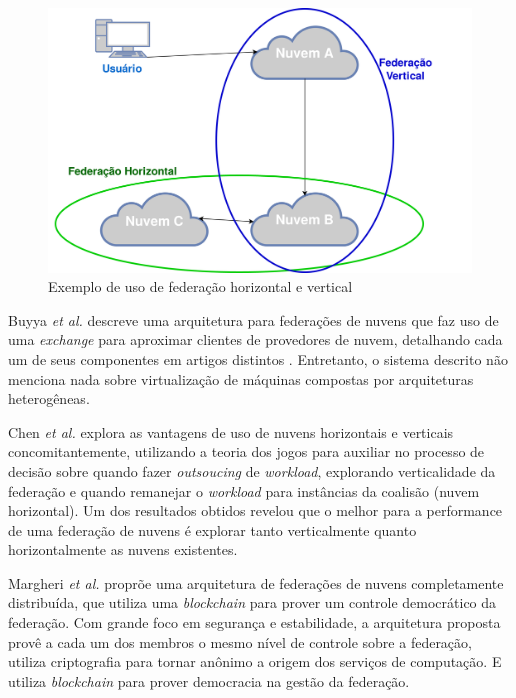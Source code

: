 \begin{figure}[htbp]
	\centerline{\includegraphics[scale=0.032]{img/ExemploFederacao.png}}
	\caption{Exemplo de uso de federação horizontal e vertical}
	\label{ExemploFederacao}
\end{figure}


Buyya \textit{et al.} \cite{Buyya:2010:IUF:2143583.2143586} descreve uma arquitetura para federações de nuvens que faz uso de uma \textit{exchange} para aproximar clientes de provedores de nuvem, detalhando cada um de seus componentes em artigos distintos \cite{Calheiros:2012:CSE:2263483.2264538} \cite{Garg2013} \cite{4539666} \cite{6063003}. Entretanto, o sistema descrito não menciona nada sobre virtualização de máquinas compostas por arquiteturas heterogêneas.

Chen \textit{et al.} \cite{7835207} explora as vantagens de uso de nuvens horizontais e verticais concomitantemente, utilizando a teoria dos jogos para auxiliar no processo de decisão sobre quando fazer \textit{outsoucing} de \textit{workload}, explorando verticalidade da federação e quando remanejar o \textit{workload} para instâncias da coalisão (nuvem horizontal). Um dos resultados obtidos revelou que o melhor para a performance de uma federação de nuvens é explorar tanto verticalmente quanto horizontalmente as nuvens existentes.

Margheri \textit{et al.} \cite{FaaS_8030651} proprõe uma arquitetura de federações de nuvens completamente distribuída, que utiliza uma \textit{blockchain} para prover um controle democrático da federação. Com grande foco em segurança e estabilidade, a arquitetura proposta provê a cada um dos membros o mesmo nível de controle sobre a federação, utiliza criptografia para tornar anônimo a origem dos serviços de computação. E utiliza \textit{blockchain} para prover democracia na gestão da federação.

